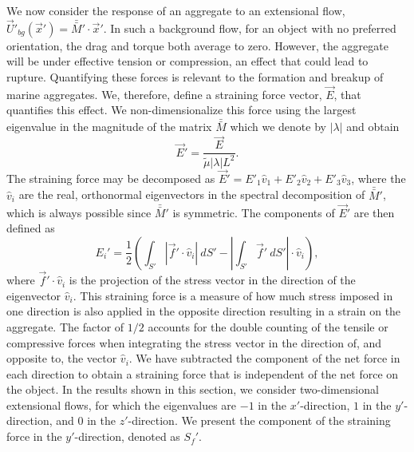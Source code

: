 We now consider the response of an aggregate to an extensional flow, $\vec{U}'_{bg}(\vec{x}') = \bar{\bar{M}}' \cdot \vec{x}'$. In such a background flow, for an object with no preferred orientation, the drag and torque both average to zero. However, the aggregate will be under effective tension or compression, an effect that could lead to rupture. Quantifying these forces is relevant to the formation and breakup of marine aggregates. 
We, therefore, define a straining force vector, $\vec{E}$, that quantifies this effect. 
We non-dimensionalize this force using the largest eigenvalue in the magnitude of the matrix $\bar{\bar{M}}$ which we denote by $|\lambda|$ and obtain  
\begin{equation}
\vec{E}' = \frac{\vec{E}}{\tilde{\mu} |\lambda| L^2}.
\label{eq_Sf1}
\end{equation}
The straining force may be decomposed as 
$\vec{E}' = E'_{1} \hat{v}_1 + E'_{2} \hat{v}_2 + E'_{3} \hat{v}_3$, where the $\hat{v}_i$ are the real, orthonormal eigenvectors in the spectral decomposition of $\bar{\bar{M}}'$, which is always possible since $\bar{\bar{M}}'$ is symmetric. 
The components of $\vec{E}'$ are  then defined as
\begin{equation}
E_i' = \frac{1}{2} \left( \int_{S'} | \vec{f}' \cdot \hat{v}_i | \ dS' - \left| \int_{S'} \vec{f}' \ dS' \right|  \cdot \hat{v}_i \right), 
\label{eq_Sf2}
\end{equation}
where $\vec{f}' \cdot \hat{v}_i$ is the projection of the stress vector in the direction of the eigenvector $\hat{v}_i$. 
This straining force is a measure of how much stress imposed in one direction is also applied in the opposite direction resulting in a strain on the aggregate. The factor of $1/2$ accounts for the double counting of the tensile or compressive forces when integrating the stress vector in the direction of, and opposite to, the vector $\hat{v}_i$. We have subtracted the component of the net force in each direction to obtain a straining force that is independent of the net force on the object. In the results shown in this section, we consider two-dimensional extensional flows, for which the eigenvalues are $-1$ in the $x'$-direction, $1$ in the $y'$-direction, and  0 in the $z'$-direction. We present the component of the straining force in the $y'$-direction, denoted as $S_f'$.

